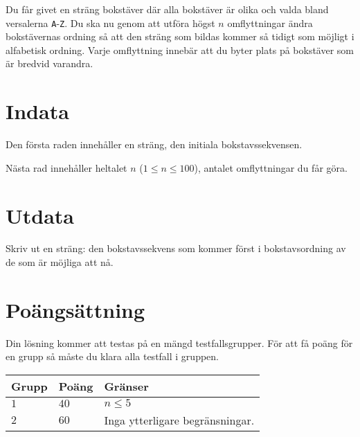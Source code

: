 
Du får givet en sträng bokstäver där alla bokstäver är olika och valda bland
versalerna \texttt{A}-\texttt{Z}. Du ska nu genom att utföra högst $n$ omflyttningar ändra
bokstävernas ordning så att den sträng som bildas kommer så tidigt som möjligt i alfabetisk ordning.
Varje omflyttning innebär att du byter plats på bokstäver som är bredvid varandra.

\section*{Indata}
Den första raden innehåller en sträng, den initiala bokstavssekvensen.

Nästa rad innehåller heltalet $n$ ($1 \leq n \leq 100$), antalet omflyttningar du får göra.

\section*{Utdata}
Skriv ut en sträng: den bokstavssekvens som kommer först i bokstavsordning av de som är möjliga att nå.

\section*{Poängsättning}
Din lösning kommer att testas på en mängd testfallsgrupper.
För att få poäng för en grupp så måste du klara alla testfall i gruppen.


\noindent
\begin{tabular}{| l | l | p{12cm} |}
  \hline
  \textbf{Grupp} & \textbf{Poäng} & \textbf{Gränser} \\ \hline
  $1$    & $40$       & $n \leq 5$ \\ \hline
  $2$    & $60$       & Inga ytterligare begränsningar. \\ \hline
\end{tabular}
